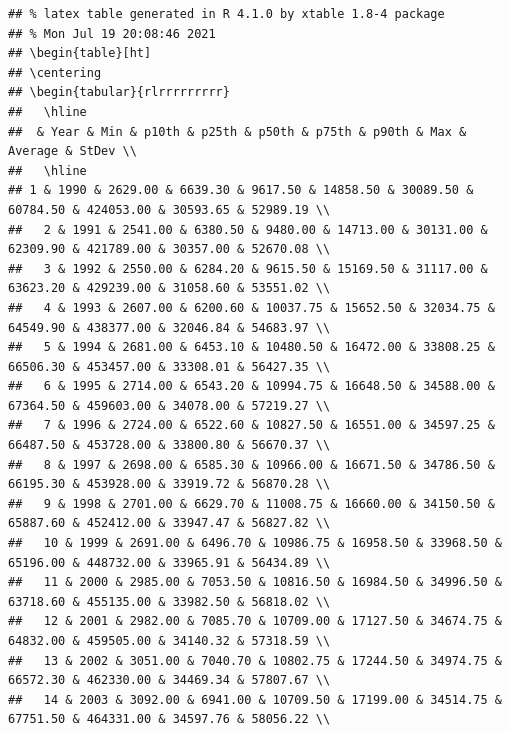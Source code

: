 \documentclass[
]{book}
\begin{document}
\begin{verbatim}
## % latex table generated in R 4.1.0 by xtable 1.8-4 package
## % Mon Jul 19 20:08:46 2021
## \begin{table}[ht]
## \centering
## \begin{tabular}{rlrrrrrrrrr}
##   \hline
##  & Year & Min & p10th & p25th & p50th & p75th & p90th & Max & Average & StDev \\ 
##   \hline
## 1 & 1990 & 2629.00 & 6639.30 & 9617.50 & 14858.50 & 30089.50 & 60784.50 & 424053.00 & 30593.65 & 52989.19 \\ 
##   2 & 1991 & 2541.00 & 6380.50 & 9480.00 & 14713.00 & 30131.00 & 62309.90 & 421789.00 & 30357.00 & 52670.08 \\ 
##   3 & 1992 & 2550.00 & 6284.20 & 9615.50 & 15169.50 & 31117.00 & 63623.20 & 429239.00 & 31058.60 & 53551.02 \\ 
##   4 & 1993 & 2607.00 & 6200.60 & 10037.75 & 15652.50 & 32034.75 & 64549.90 & 438377.00 & 32046.84 & 54683.97 \\ 
##   5 & 1994 & 2681.00 & 6453.10 & 10480.50 & 16472.00 & 33808.25 & 66506.30 & 453457.00 & 33308.01 & 56427.35 \\ 
##   6 & 1995 & 2714.00 & 6543.20 & 10994.75 & 16648.50 & 34588.00 & 67364.50 & 459603.00 & 34078.00 & 57219.27 \\ 
##   7 & 1996 & 2724.00 & 6522.60 & 10827.50 & 16551.00 & 34597.25 & 66487.50 & 453728.00 & 33800.80 & 56670.37 \\ 
##   8 & 1997 & 2698.00 & 6585.30 & 10966.00 & 16671.50 & 34786.50 & 66195.30 & 453928.00 & 33919.72 & 56870.28 \\ 
##   9 & 1998 & 2701.00 & 6629.70 & 11008.75 & 16660.00 & 34150.50 & 65887.60 & 452412.00 & 33947.47 & 56827.82 \\ 
##   10 & 1999 & 2691.00 & 6496.70 & 10986.75 & 16958.50 & 33968.50 & 65196.00 & 448732.00 & 33965.91 & 56434.89 \\ 
##   11 & 2000 & 2985.00 & 7053.50 & 10816.50 & 16984.50 & 34996.50 & 63718.60 & 455135.00 & 33982.50 & 56818.02 \\ 
##   12 & 2001 & 2982.00 & 7085.70 & 10709.00 & 17127.50 & 34674.75 & 64832.00 & 459505.00 & 34140.32 & 57318.59 \\ 
##   13 & 2002 & 3051.00 & 7040.70 & 10802.75 & 17244.50 & 34974.75 & 66572.30 & 462330.00 & 34469.34 & 57807.67 \\ 
##   14 & 2003 & 3092.00 & 6941.00 & 10709.50 & 17199.00 & 34514.75 & 67751.50 & 464331.00 & 34597.76 & 58056.22 \\ 

\end{verbatim}
\end{document}

